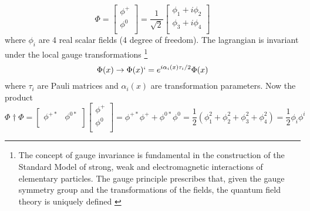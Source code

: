 	\begin{equation}\label{mat2}
	\Phi=
		\begin{bmatrix}
		\phi^+	\\
		\phi^0	\\
		\end{bmatrix}
	=\frac{1}{\sqrt{2}}
		\begin{bmatrix}
		\phi_1 + i\phi_2	\\
		\phi_3 + i\phi_4	\\
		\end{bmatrix}
	\end{equation}
where $\phi_i$ are 4 real scalar fields (4 degree of freedom). The lagrangian is invariant under the local gauge transformations \footnote{The concept of gauge invariance is fundamental in the construction of the Standard Model of strong, weak and electromagnetic interactions of elementary particles. The gauge principle prescribes that, given the gauge symmetry group and the transformations of the fields, the quantum field theory is uniquely defined \cite{book:CoughlanDodd}}
	\begin{equation}
	\Phi (x) \rightarrow \Phi(x)`=e^{i\alpha_i(x)\tau_i /2}\Phi(x)
	\end{equation}
where $\tau_i$ are Pauli matrices and $\alpha_i(x)$ are transformation parameters.
Now the product
	\begin{equation}\label{mat1}
	\Phi{\dagger}\Phi=
		\begin{bmatrix}
		\phi^{+*}	&	\phi^{0*} \\
		\end{bmatrix}
		\begin{bmatrix}
		\phi^+	\\
		\phi^0	\\
		\end{bmatrix}
	=\phi^{+*} \phi^+ + \phi^{0*}\phi^0
	=\frac{1}{2}(\phi^2_1+\phi^2_2+\phi^2_3+\phi^2_4)
	=\frac{1}{2}\phi_i \phi^i
	\end{equation}
	
